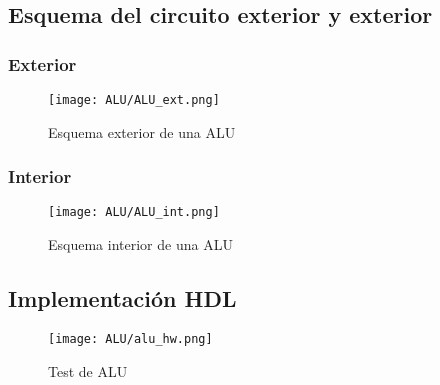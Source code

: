 \documentclass[12pt]{article}
\begin{document}
    \subsection{Esquema del circuito exterior y exterior} 
            \subsubsection{Exterior}
            \begin{figure}[H]
                \centering
                \texttt{[image: ALU/ALU\_ext.png]}
                \caption{Esquema exterior de una ALU}
                \label{fig:Inc16}
            \end{figure}
        \subsubsection{Interior} 
        \begin{figure}[H]
            \centering
            \texttt{[image: ALU/ALU\_int.png]}
            \caption{Esquema interior de una ALU}
            \label{fig:f_Inc16}
        \end{figure}
    \subsection{Implementación HDL}
    \begin{figure}[H]
        \centering
        \texttt{[image: ALU/alu\_hw.png]}
        \caption{Test de ALU}
        \label{fig:enter-label}
    \end{figure}
\end{document}
